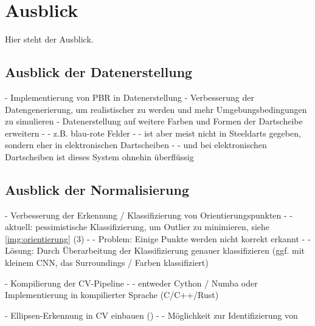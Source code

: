 
\chapter{Ausblick}
\label{cha:ausblick}

Hier steht der Ausblick.


\section{Ausblick der Datenerstellung}
\label{sec:ausblick_data}

- Implementierung von PBR in Datenerstellung
- Verbesserung der Datengenerierung, um realistischer zu werden und mehr Umgebungsbedingungen zu simulieren
- Datenerstellung auf weitere Farben und Formen der Dartscheibe erweitern
- - z.B. blau-rote Felder
- - ist aber meist nicht in Steeldarts gegeben, sondern eher in elektronischen Dartscheiben
- - und bei elektronischen Dartscheiben ist dieses System ohnehin überflüssig



\section{Ausblick der Normalisierung}
\label{sec:ausblick_cv}

- Verbesserung der Erkennung / Klassifizierung von Orientierungspunkten
- - aktuell: pessimistische Klassifizierung, um Outlier zu minimieren, siehe \autoref{img:orientierung} (3)
- - Problem: Einige Punkte werden nicht korrekt erkannt
- - Lösung: Durch Überarbeitung der Klassifizierung genauer klassifizieren (ggf. mit kleinem CNN, das Surroundings / Farben klassifiziert)

- Kompilierung der CV-Pipeline
- - entweder Cython \cite{cython} / Numba \cite{numba} oder Implementierung in kompilierter Sprache (C/C++/Rust)

- Ellipsen-Erkennung in CV einbauen (\cite{ellipse_detection_algorithm})
- - Möglichkeit zur Identifizierung von 



